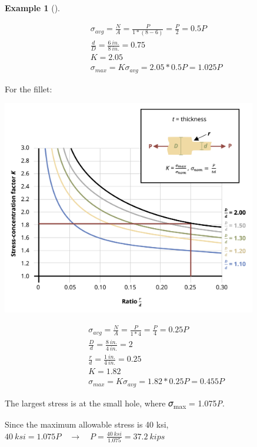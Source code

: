 \documentclass[
  letterpaper,
  DIV=11,
  numbers=noendperiod]{scrreprt}
\theoremstyle{definition}
\newtheorem{example}{Example}[chapter]
\theoremstyle{remark}
\begin{document}
\begin{tcolorbox}
\begin{example}[]
\begin{tcolorbox}
\[
\begin{aligned}
& \sigma_{avg}=\frac{N}{A}=\frac{P}{1 *(8-6)}=\frac{P}{2}=0.5 P \\
& \frac{d}{D}=\frac{6{~in.}}{8{~in.}}=0.75 \\
& K=2.05 \\
& \sigma_{max}=K \sigma_{avg}=2.05 * 0.5 P=1.025 P
\end{aligned}
\]

For the fillet:

\begin{center}
\includegraphics[width=4.38542in,height=\textheight]{images/PNGs/Example 5.2 part 4.png}
\end{center}

\[
\begin{aligned}
& \sigma_{avg}=\frac{N}{A}=\frac{P}{1 * 4}=\frac{P}{4}=0.25 P \\
& \frac{D}{d}=\frac{8{~in.}}{4{~in.}}=2 \\
& \frac{r}{d}=\frac{1{~in.}}{4{~in.}}=0.25 \\
& K=1.82 \\
& \sigma_{max}=K \sigma_{avg}=1.82 * 0.25 P=0.455 P
\end{aligned}
\]

The largest stress is at the small hole, where 𝜎\textsubscript{max} =
1.075\emph{P}.

Since the maximum allowable stress is 40 ksi,
\(40{~ksi}=1.075 P \quad\rightarrow\quad P=\frac{40{~ksi}}{1.075}=37.2{~kips}\)

\end{tcolorbox}

\end{example}

\end{tcolorbox}
\end{document}
